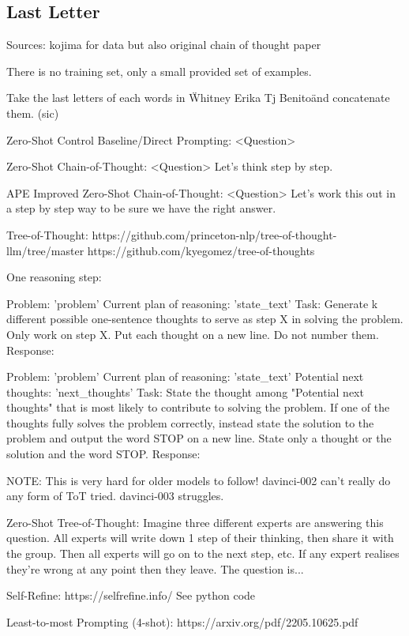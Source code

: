 \documentclass[11pt]{article}
\begin{document}
\subsection{Last Letter}

Sources: kojima for data but also original chain of thought paper

There is no training set, only a small provided set of examples.

Take the last letters of each words in \"Whitney Erika Tj Benito\" and concatenate them. (sic)

Zero-Shot Control Baseline/Direct Prompting:
<Question>

Zero-Shot Chain-of-Thought:
<Question>
Let's think step by step.

APE Improved Zero-Shot Chain-of-Thought:
<Question>
Let's work this out in a step by step way to be sure we have the right answer.

Tree-of-Thought: https://github.com/princeton-nlp/tree-of-thought-llm/tree/master https://github.com/kyegomez/tree-of-thoughts

One reasoning step:

Problem:
'{problem}' 
Current plan of reasoning:
'{state_text}'
Task:
Generate {k} different possible one-sentence thoughts to serve as step {X} in solving the problem. Only work on step {X}. Put each thought on a new line. Do not number them.
Response:

Problem:
'{problem}' 
Current plan of reasoning:
'{state_text}'
Potential next thoughts:
'{next_thoughts}'
Task:
State the thought among "Potential next thoughts" that is most likely to contribute to solving the problem. If one of the thoughts fully solves the problem correctly, instead state the solution to the problem and output the word STOP on a new line. State only a thought or the solution and the word STOP.
Response:

NOTE: This is very hard for older models to follow! davinci-002 can't really do any form of ToT tried. davinci-003 struggles.

Zero-Shot Tree-of-Thought:
Imagine three different experts are answering this question.
All experts will write down 1 step of their thinking,
then share it with the group.
Then all experts will go on to the next step, etc.
If any expert realises they're wrong at any point then they leave.
The question is...

Self-Refine: https://selfrefine.info/
See python code

Least-to-most Prompting (4-shot): https://arxiv.org/pdf/2205.10625.pdf
\end{document}
